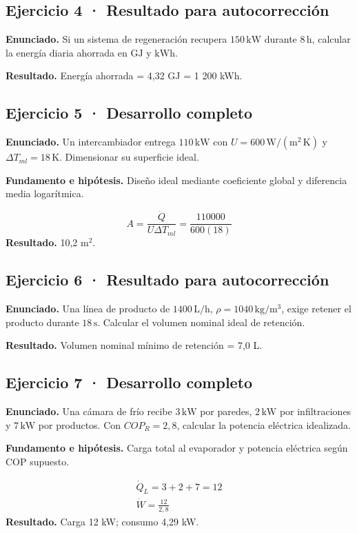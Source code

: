 \documentclass[11pt,a4paper]{article}
\begin{document}
\subsection*{Ejercicio 4 · Resultado para autocorrección}
\textbf{Enunciado.} Si un sistema de regeneración recupera \(150\,\mathrm{kW}\) durante \(8\,\mathrm h\), calcular la energía diaria ahorrada en \(\mathrm{GJ}\) y \(\mathrm{kWh}\).

\textbf{Resultado.} Energía ahorrada = 4,32 GJ = 1 200 kWh.


\subsection*{Ejercicio 5 · Desarrollo completo}
\textbf{Enunciado.} Un intercambiador entrega \(110\,\mathrm{kW}\) con \(U=600\,\mathrm{W/(m^2\,K)}\) y \(\Delta T_{ml}=18\,\mathrm K\). Dimensionar su superficie ideal.

\textbf{Fundamento e hipótesis.} Diseño ideal mediante coeficiente global y diferencia media logarítmica.

\[
A=\frac{\dot Q}{U\Delta T_{ml}}=\frac{110000}{600(18)}
\]
\textbf{Resultado.} 10,2 m\ensuremath{^2}.


\subsection*{Ejercicio 6 · Resultado para autocorrección}
\textbf{Enunciado.} Una línea de producto de \(1400\,\mathrm{L/h}\), \(\rho=1040\,\mathrm{kg/m^3}\), exige retener el producto durante \(18\,\mathrm s\). Calcular el volumen nominal ideal de retención.

\textbf{Resultado.} Volumen nominal mínimo de retención = 7,0 L.


\subsection*{Ejercicio 7 · Desarrollo completo}
\textbf{Enunciado.} Una cámara de frío recibe \(3\,\mathrm{kW}\) por paredes, \(2\,\mathrm{kW}\) por infiltraciones y \(7\,\mathrm{kW}\) por productos. Con \(COP_R=2{,}8\), calcular la potencia eléctrica idealizada.

\textbf{Fundamento e hipótesis.} Carga total al evaporador y potencia eléctrica según COP supuesto.

\[
\begin{gathered}
\dot Q_L=3+2+7=12\\\dot W=\frac{12}{2{,}8}
\end{gathered}
\]
\textbf{Resultado.} Carga 12 kW; consumo 4,29 kW.
\end{document}
